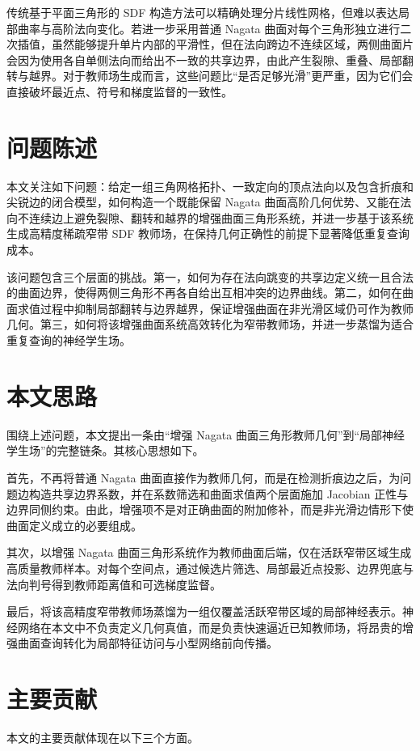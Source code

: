 \documentclass[12pt,oneside]{ctexbook}
\begin{document}
传统基于平面三角形的 SDF 构造方法可以精确处理分片线性网格，但难以表达局部曲率与高阶法向变化。若进一步采用普通 Nagata 曲面对每个三角形独立进行二次插值，虽然能够提升单片内部的平滑性，但在法向跨边不连续区域，两侧曲面片会因为使用各自单侧法向而给出不一致的共享边界，由此产生裂隙、重叠、局部翻转与越界。对于教师场生成而言，这些问题比“是否足够光滑”更严重，因为它们会直接破坏最近点、符号和梯度监督的一致性。

\section{问题陈述}
本文关注如下问题：给定一组三角网格拓扑、一致定向的顶点法向以及包含折痕和尖锐边的闭合模型，如何构造一个既能保留 Nagata 曲面高阶几何优势、又能在法向不连续边上避免裂隙、翻转和越界的增强曲面三角形系统，并进一步基于该系统生成高精度稀疏窄带 SDF 教师场，在保持几何正确性的前提下显著降低重复查询成本。

该问题包含三个层面的挑战。第一，如何为存在法向跳变的共享边定义统一且合法的曲面边界，使得两侧三角形不再各自给出互相冲突的边界曲线。第二，如何在曲面求值过程中抑制局部翻转与边界越界，保证增强曲面在非光滑区域仍可作为教师几何。第三，如何将该增强曲面系统高效转化为窄带教师场，并进一步蒸馏为适合重复查询的神经学生场。

\section{本文思路}
围绕上述问题，本文提出一条由“增强 Nagata 曲面三角形教师几何”到“局部神经学生场”的完整链条。其核心思想如下。

首先，不再将普通 Nagata 曲面直接作为教师几何，而是在检测折痕边之后，为问题边构造共享边界系数，并在系数筛选和曲面求值两个层面施加 Jacobian 正性与边界同侧约束。由此，增强项不是对正确曲面的附加修补，而是非光滑边情形下使曲面定义成立的必要组成。

其次，以增强 Nagata 曲面三角形系统作为教师曲面后端，仅在活跃窄带区域生成高质量教师样本。对每个空间点，通过候选片筛选、局部最近点投影、边界兜底与法向判号得到教师距离值和可选梯度监督。

最后，将该高精度窄带教师场蒸馏为一组仅覆盖活跃窄带区域的局部神经表示。神经网络在本文中不负责定义几何真值，而是负责快速逼近已知教师场，将昂贵的增强曲面查询转化为局部特征访问与小型网络前向传播。

\section{主要贡献}
本文的主要贡献体现在以下三个方面。
\end{document}
